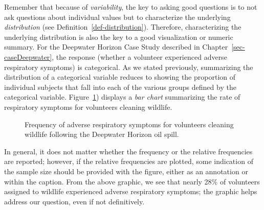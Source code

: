 \documentclass[
  letterpaper,
  DIV=11,
  numbers=noendperiod]{scrreprt}
\theoremstyle{plain}
\theoremstyle{definition}
\theoremstyle{definition}
\theoremstyle{remark}
\begin{document}
Remember that because of \emph{variability}, the key to asking good
questions is to not ask questions about individual values but to
characterize the underlying \emph{distribution} (see
Definition~\ref{def-distribution}). Therefore, characterizing the
underlying distribution is also the key to a good visualization or
numeric summary. For the Deepwater Horizon Case Study described in
Chapter~\ref{sec-caseDeepwater}, the response (whether a volunteer
experienced adverse respiratory symptoms) is categorical. As we stated
previously, summarizing the distribution of a categorical variable
reduces to showing the proportion of individual subjects that fall into
each of the various groups defined by the categorical variable.
Figure~\ref{fig-summaries-deepwater-barchart}) displays a \emph{bar
chart} summarizing the rate of respiratory symptoms for volunteers
cleaning wildlife.

\begin{figure}


\caption{\label{fig-summaries-deepwater-barchart}Frequency of adverse
respiratory symptoms for volunteers cleaning wildlife following the
Deepwater Horizon oil spill.}

\end{figure}%

In general, it does not matter whether the frequency or the relative
frequencies are reported; however, if the relative frequencies are
plotted, some indication of the sample size should be provided with the
figure, either as an annotation or within the caption. From the above
graphic, we see that nearly 28\% of volunteers assigned to wildlife
experienced adverse respiratory symptoms; the graphic helps address our
question, even if not definitively.
\end{document}
